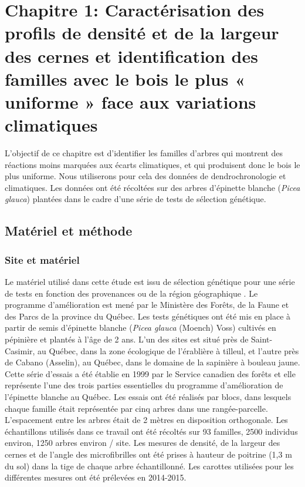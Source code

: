 \documentclass[a4paper,12pt]{report}
\begin{document}
\chapter{Chapitre 1: Caractérisation des profils de densité et de la largeur des cernes et identification des familles avec le bois le plus « uniforme » face aux variations climatiques}


L'objectif de ce chapitre est d'identifier les familles d'arbres qui montrent des réactions moins marquées aux écarts climatiques, et qui produisent donc le bois le plus uniforme. Nous utiliserons pour cela des données de dendrochronologie et climatiques. Les données ont été récoltées sur des arbres d'épinette blanche (\textit{Picea glauca}) plantées dans le cadre d'une série de tests de sélection génétique. 


\section{Matériel et méthode}

\subsection*{Site et matériel}\label{matériel}

Le matériel utilisé dans cette étude est issu de sélection génétique pour une série de tests en fonction des provenances ou de la région géographique \citep{Beaulieu1996}. Le programme d’amélioration est mené par le Ministère des Forêts, de la Faune et des Parcs de la province du Québec. Les tests génétiques ont été mis en place à partir de semis d'épinette blanche (\textit{Picea glauca} (Moench) Voss) cultivés en pépinière et plantés à l'âge de 2 ans. L'un des sites est situé près de Saint-Casimir, au Québec, dans la zone écologique de l'érablière à tilleul, et l'autre près de Cabano (Asselin), au Québec, dans le domaine de la sapinière à bouleau jaune. Cette série d'essais a été établie en 1999 par le Service canadien des forêts et elle représente l'une des trois parties essentielles du programme d'amélioration de l'épinette blanche au Québec. Les essais ont été réalisés par blocs, dans lesquels chaque famille était représentée par cinq arbres dans une rangée-parcelle. L'espacement entre les arbres était de 2 mètres en disposition orthogonale. Les échantillons utilisés dans ce travail ont été récoltés sur 93 familles, 2500  individus environ, 1250 arbres environ / site. Les mesures de densité, de la largeur des cernes et de l'angle des microfibrilles ont été prises à hauteur de poitrine (1,3 m du sol) dans la tige de chaque arbre échantillonné. Les carottes utilisées pour les différentes mesures ont été prélevées en 2014-2015.  \\ 
\end{document}

